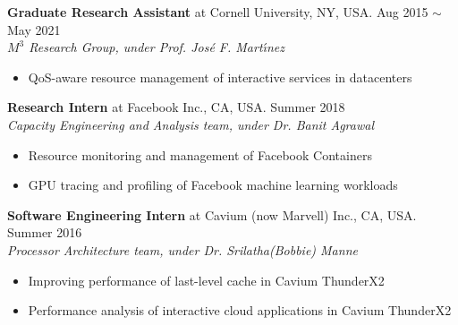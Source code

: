 \documentclass{res}
\begin{document}
\begin{resume}
{\bf Graduate Research Assistant} at Cornell University, NY, USA.  \hfill   Aug 2015 $\sim$ May 2021 \\
\textit{$M^3$ Research Group, under Prof. Jos{\'e} F. Mart{\'\i}nez}
    \vspace{0.0in}
    \begin{itemize}\itemsep0pt \parskip0pt 
        \item QoS-aware resource management of interactive services in datacenters
    \end{itemize}
    
{ \bf Research Intern} at Facebook Inc., CA, USA.  \hfill   Summer 2018 \\
 \textit{Capacity Engineering and Analysis team, under Dr. Banit Agrawal}
    \vspace{0.0in}
    \begin{itemize}\itemsep0pt \parskip0pt 
        \item Resource monitoring and management of Facebook Containers 
        \item GPU tracing and profiling of Facebook machine learning workloads
    \end{itemize} 

{\bf Software Engineering Intern} at Cavium (now Marvell) Inc., CA, USA.  \hfill   Summer 2016 \\
 \textit{Processor Architecture team, under Dr. Srilatha(Bobbie) Manne}
    \begin{itemize}\itemsep0pt \parskip0pt 
        \item Improving performance of last-level cache in Cavium ThunderX2
        \item Performance analysis of interactive cloud applications in Cavium ThunderX2
    \end{itemize}
    

\end{resume}
\end{document}
